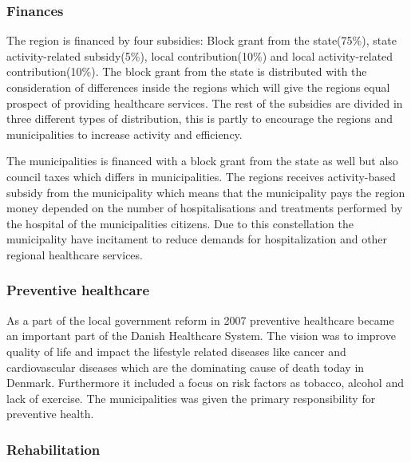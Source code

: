 





\subsubsection{Finances}

The region is financed by four subsidies: Block grant from the state(75\%), state activity-related subsidy(5\%), local contribution(10\%) and local activity-related contribution(10\%). The block grant from the state is distributed with the consideration of differences inside the regions which will give the regions equal prospect of providing healthcare services. The rest of the subsidies are divided in three different types of distribution, this is partly to encourage the regions and municipalities to increase activity and efficiency\cite{sundhedsministeriet}.

The municipalities is financed with a block grant from the state as well but also council taxes which differs in municipalities. The regions receives activity-based subsidy from the municipality which means that the municipality pays the region money depended on the number of hospitalisations and treatments performed by the hospital of the municipalities citizens. Due to this constellation the municipality have incitament to reduce demands for hospitalization and other regional healthcare services\cite{Healthcareindk2}.



\subsubsection{Preventive healthcare}

As a part of the local government reform in 2007 preventive healthcare became an important part of the Danish Healthcare System. The vision was to improve quality of life and impact the lifestyle related diseases like cancer and cardiovascular diseases which are the dominating cause of death today in Denmark. Furthermore it included a focus on risk factors as tobacco, alcohol and lack of exercise. The municipalities was given the primary responsibility for preventive health\cite{sundhedsministeriet}.

\subsubsection{Rehabilitation}

